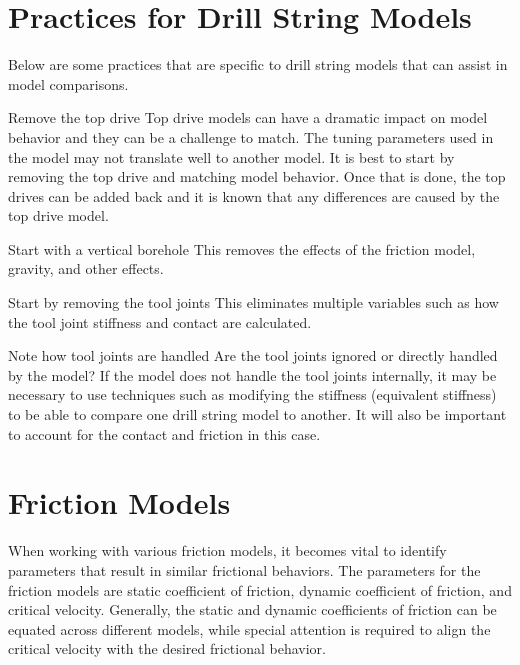 \section{Practices for Drill String Models}
Below are some practices that are specific to drill string models that can assist in model comparisons.

\begin{definition}{Remove the top drive}
Top drive models can have a dramatic impact on model behavior and they can be a challenge to match.  The tuning parameters used in the model may not translate well to another model.  It is best to start by removing the top drive and matching model behavior.  Once that is done, the top drives can be added back and it is known that any differences are caused by the top drive model.
\end{definition}

\begin{definition}{Start with a vertical borehole}
This removes the effects of the friction model, gravity, and other effects.
\end{definition}

\begin{definition}{Start by removing the tool joints}
This eliminates multiple variables such as how the tool joint stiffness and contact are calculated.
\end{definition}

\begin{definition}{Note how tool joints are handled}
Are the tool joints ignored or directly handled by the model?  If the model does not handle the tool joints internally, it may be necessary to use techniques such as modifying the stiffness (equivalent stiffness) to be able to compare one drill string model to another.  It will also be important to account for the contact and friction in this case.
\end{definition}

\section{Friction Models}
When working with various friction models, it becomes vital to identify parameters that result in similar frictional behaviors.  The parameters for the friction models are static coefficient of friction, dynamic coefficient of friction, and critical velocity. Generally, the static and dynamic coefficients of friction can be equated across different models, while special attention is required to align the critical velocity with the desired frictional behavior.

